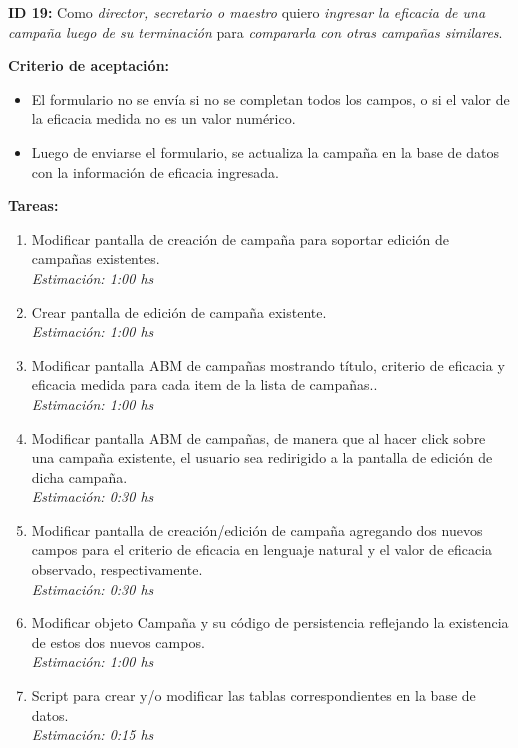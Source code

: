 \documentclass[a4paper, 10pt, twoside]{article}
\newcommand{\sprintstory}[4]{
  \noindent
  \textbf{ID #1:} Como \emph{#2} quiero \emph{#3} para \emph{#4}.
}
\newenvironment{criterios}{
  \textbf{Criterio de aceptación:}
  \begin{itemize}
}{
  \end{itemize}
}
\newcommand{\criterio}[1] {
  \item #1
}
\newenvironment{tasks}{
  \textbf{Tareas:}
  \begin{enumerate}
}{
  \end{enumerate}
}
\newcommand{\task}[2] {
  \item #1.\\
  \emph{Estimación: #2 hs}
}
\begin{document}
\sprintstory{19}
            {director, secretario o maestro}
            {ingresar la eficacia de una campaña luego de su terminación}
            {compararla con otras campañas similares}

\begin{criterios}
  \criterio{El formulario no se envía si no se completan todos los campos, o si el valor de la eficacia medida no es un valor numérico.}
  \criterio{Luego de enviarse el formulario, se actualiza la campaña en la base de datos con la información de eficacia ingresada.}
\end{criterios}

\begin{tasks}
  \task{Modificar pantalla de creación de campaña para soportar edición de campañas existentes}{1:00}
  \task{Crear pantalla de edición de campaña existente}{1:00}
  \task{Modificar pantalla ABM de campañas mostrando título, criterio de eficacia y eficacia medida para cada item de la lista de campañas.}{1:00}
  \task{Modificar pantalla ABM de campañas, de manera que al hacer click sobre una campaña existente, el usuario sea redirigido a la pantalla de edición de dicha campaña}{0:30}
  \task{Modificar pantalla de creación/edición de campaña agregando dos nuevos campos para el criterio de eficacia en lenguaje natural y el valor de eficacia observado, respectivamente}{0:30}
  \task{Modificar objeto Campaña y su código de persistencia reflejando la existencia de estos dos nuevos campos}{1:00}
  \task{Script para crear y/o modificar las tablas correspondientes en la base de datos}{0:15}
\end{tasks}
\end{document}
